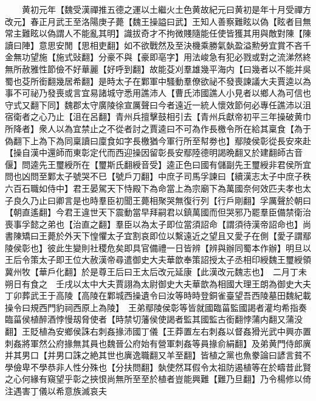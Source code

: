 　　黄初元年【魏受漢禪推五德之運以土繼火土色黄故紀元曰黄初是年十月受禪方改元】春正月武王至洛陽庚子薨【魏王操謚曰武】王知人善察難眩以偽【眩者目無常主難眩以偽謂人不能亂其明】識拔奇才不拘微賤隨能任使皆獲其用與敵對陳【陳讀曰陣】意思安閒【思相吏翻】如不欲戰然及至決機乘勝氣埶盈溢勲勞宜賞不吝千金無功望施【施式䜴翻】分豪不與【豪即亳字】用法峻急有犯必戮或對之流涕然終無所赦雅性節儉不好華麗【好呼到翻】故能芟刈羣雄幾平海内【曰幾者以不能并吳蜀也芟所銜翻幾居希翻】是時太子在鄴軍中騷動羣僚欲祕不發喪諫議大夫賈逵以為事不可祕乃發喪或言宜易諸城守悉用譙沛人【曹氏沛國譙人小見者以鄉人為可信也守式又翻下同】魏郡太守廣陵徐宣厲聲曰今者遠近一統人懷效節何必專任譙沛以沮宿衛者之心乃止【沮在呂翻】青州兵擅擊鼓相引去【青州兵獻帝初平三年操破黄巾所降者】衆人以為宜禁止之不從者討之賈逵曰不可為作長檄令所在給其稟食【為于偽翻下上為下為同稟讀曰廩食如字長檄猶今軍行所至幇劵也】鄢陵侯彰從長安來赴【操自漢中還師而東彰定代而西迎操因留彰長安鄢陸德明謁晩翻又於建翻師古音偃】問逵先王璽綬所在【璽斯氏翻綬音受】逵正色曰國有儲副先王璽綬非君侯所宜問也凶問至鄴太子號哭不巳【號戶刀翻】中庶子司馬孚諫曰【續漢志太子中庶子秩六百石職如侍中】君王晏駕天下恃殿下為命當上為宗廟下為萬國奈何效匹夫孝也太子良久乃止曰卿言是也時羣臣初聞王薨相聚哭無復行列【行戶剛翻】孚厲聲於朝曰【朝直遙翻】今君王違世天下震動當早拜嗣君以鎮萬國而但哭邪乃罷羣臣備禁衛治喪事孚懿之弟也【治直之翻】羣臣以為太子即位當須詔命【謂須待漢帝詔命也】尚書陳矯曰王薨於外天下惶懼太子宜割哀即位以繫遠近之望且又愛子在側【愛子謂鄢陵侯彰也】彼此生變則社稷危矣即具官備禮一日皆辨【辨與辦同蜀本作辦】明旦以王后令策太子即王位大赦漢帝尋遣御史大夫華歆奉策詔授太子丞相印綬魏王璽綬領冀州牧【華戶化翻】於是尊王后曰王太后改元延康【此漢改元魏志也】　二月丁未朔日有食之　壬戌以太中大夫賈詡為太尉御史大夫華歆為相國大理王朗為御史大夫　丁卯葬武王于高陵【高陵在鄴城西操遺令曰汝等時時登銅雀臺望吾西陵墓田魏紀載操令曰規西門豹祠西原上為陵】　王弟鄢陵侯彰等皆就國臨菑監國謁者灌均希指奏臨菑侯植醉酒悖慢刼脅使者【時禁切藩侯使謁者監其國監古銜翻悖蒲内翻又蒲没翻】王貶植為安鄉侯誅右刺姦掾沛國丁儀【王莽置左右刺姦以督姦猾光武中興亦置刺姦將軍然公府掾無其員也魏晉公府始有營軍刺姦等員掾俞絹翻】及弟黄門侍郎廙并其男口【并男口誅之絶其世也廙逸職翻又羊至翻】皆植之黨也魚豢論曰諺言貧不學儉卑不學恭非人性分殊也【分扶問翻】埶使然耳假令太祖防遏植等在於疇昔此賢之心何緣有窺望乎彰之挾恨尚無所至至於植者豈能興難【難乃旦翻】乃令楊修以倚注遇害丁儀以希意族滅哀夫

